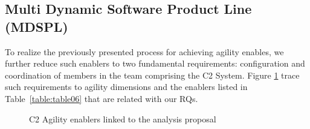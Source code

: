 





\subsection{Multi Dynamic Software Product Line (MDSPL) }


To realize the previously presented process for achieving agility enables, we further reduce such enablers to two fundamental requirements: configuration and coordination of members in the team comprising the C2 System. Figure \ref{c2a2} trace such requirements to agility dimensions and the enablers listed in Table~\ref{table:table06} that are related with our RQs. 

\begin{figure}[h]
\centering
\label{c2a2}
\scalebox{.7}{}
\caption{C2 Agility enablers linked to the analysis proposal}
\end{figure}


